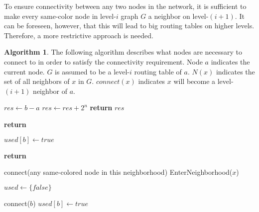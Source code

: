 \documentclass[14pt]{extarticle}
\theoremstyle{definition}
\newtheorem{algo}{Algorithm}
\begin{document}
To ensure connectivity between any two nodes in the network, it is sufficient to make every same-color node in level-$i$ graph $G$ a neighbor on level-$(i+1)$. It can be foreseen, however, that this will lead to big routing tables on higher levels. Therefore, a more restrictive approach is needed.

\begin{algo}
    The following algorithm describes what nodes are necessary to connect to in order to satisfy the connectivity requirement. Node $a$ indicates the current node. $G$ is assumed to be a level-$i$ routing table of $a$. $N(x)$ indicates the set of all neighbors of $x$ in $G$. $connect(x)$ indicates $x$ will become a level-$(i+1)$ neighbor of $a$.

    \begin{samepage}
    \begin{algorithmic}[1]
                          
            \State $res \gets b-a$
                \State $res \gets res + 2^n$       
            \EndIf
            \State \textbf{return} $res$
        \EndFunction
        
        \State

                \State \textbf{return}      
            \EndIf
                
            \State $used[b] \gets true$

                \State \textbf{return}      
            \EndIf

                \State connect(any same-colored node in this neighborhood)
            \Else
                    \State EnterNeighborhood($x$)
                \EndFor
            \EndIf
        \EndFunction

        \State

            \State $used \gets \{false\}$

                    \State connect($b$)      
                \Else
                    \State $used[b] \gets true$


\end{algorithmic}
\end{samepage}
\end{algo}
\end{document}
